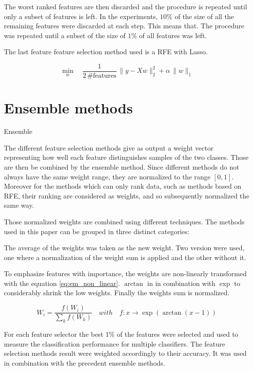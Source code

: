 \documentclass[twoside,11pt]{article}
\begin{document}
The worst ranked features are then discarded and the procedure is repeated until only a subset of features is left. In the experiments, $10\%$ of the size of all the remaining features were discarded at each step. This means that. The procedure was repeated until a subset of the size of $1\%$ of all features was left.

The last feature feature selection method used is a RFE with Lasso.

\begin{equation}
  \min_w \quad \frac1{2 \, \textrm{\#features}} \, \|y - Xw\|^2_2 + \alpha \, \|w\|_1
\end{equation}


\section{Ensemble methods}

Ensemble

The different feature selection methods give as output a weight vector representing how well each feature distinguishes samples of the two classes. Those are then be combined by the ensemble method. Since different methods do not always have the same weight range, they are normalized to the range $[0,1]$. Moreover for the methods which can only rank data, such as methods based on RFE, their ranking are considered as weights, and so subsequently normalized the same way. 

Those normalized weights are combined using different techniques. The methods used in this paper can be grouped in three distinct categories: 

\begin{description}[align=left]
\item [Linear aggregation :] The average of the weights was taken as the new weight. Two version were used, one where a normalization of the weight sum is applied and the other without it.
\item [Non-linear aggregation :] To emphasize features with importance, the weights are non-linearly transformed with the equation \ref{eq:em_non_linear}. $\arctan$ in in combination with $\exp$ to considerably shrink the low weights. Finally the weights sum is normalized.

\begin{equation}
  \label{eq:em_non_linear}
  W_i = \frac{f \left( W_i \right)}{\sum_k f \left( W_k \right)} \quad with \quad f : x \rightarrow \exp( \arctan(x - 1) )
\end{equation}

\item [Performance related aggregation :] For each feature selector the best 1\% of the features were selected and used to measure the classification performance for multiple classifiers. The feature selection methods result were weighted accordingly to their accuracy. It was used in combination with the precedent ensemble methods.
\end{description}
\end{document}

